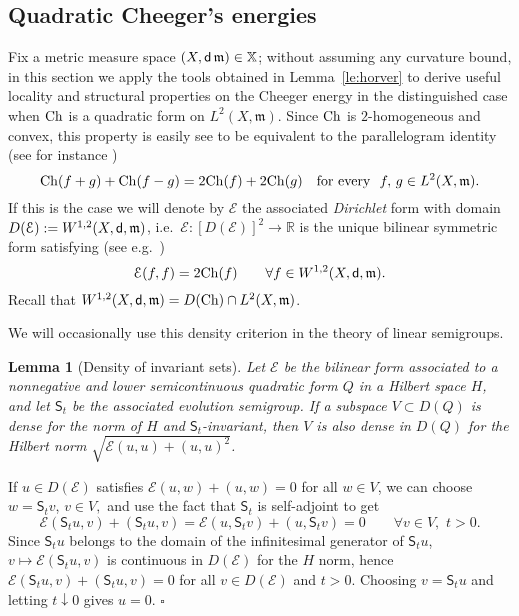 \documentclass[reqno,11pt]{article}
\numberwithin{equation}{section}
\newcommand{\C}{\mathbb{C}}
\newcommand{\Q}{\mathbb{Q}}
\newcommand{\R}{\mathbb{R}}
\newcommand{\mm}{{\mbox{\boldmath$m$}}}
\newcommand{\sfd}{{\sf d}}
\newcommand{\sfS}{{\sf S}}
\newcommand{\forevery}{\text{for every }}
\newenvironment{proof}{\removelastskip\par\medskip   %
\noindent{\em Proof.}
\rm}{\penalty-20\null\hfill$\square$\par\medbreak}
\newtheorem{lemma}[theorem]{Lemma}
\newcommand{\X}{\mathbb X}
\renewcommand{\C}{{\rm Ch}}
\renewcommand{\mm}{\mathfrak m}
\begin{document}
\subsection{Quadratic Cheeger's energies}
\label{sec:quadratic}

Fix a metric measure space $(X,\sfd\,\mm)\in \X$; without assuming
any curvature bound, in this section we apply the tools obtained in
Lemma~\ref{le:horver} to derive useful locality and structural
properties on the Cheeger energy in the distinguished case when $\C$
is a quadratic form on $L^2(X,\mm)$. Since $\C$ is $2$-homogeneous
and convex, this property is easily see to be equivalent to the
parallelogram identity (see for instance
\cite[Proposition~11.9]{DalMaso93})
\begin{equation}\label{eq:18}
      \C(f+g)+\C(f-g)=2\C(f)+2\C(g)\quad\forevery\ f,\,g\in
      L^2(X,\mm).
\end{equation}
If this is the case we will denote by $\mathcal E$ the associated
\emph{Dirichlet} form with domain $D(\mathcal
E):=W^{1,2}(X,\sfd,\mm)$, i.e.~$\mathcal E:[D(\mathcal E)]^2\to \R$
is the unique bilinear symmetric form satisfying (see e.g.\
\cite[Prop.~11.9]{DalMaso93})
\[
\mathcal E(f,f)=2\C(f)\qquad\forall f\in W^{1,2}(X,\sfd,\mm).
\]
Recall that $W^{1,2}(X,\sfd,\mm)=D(\C)\cap L^2(X,\mm)$.

We will occasionally use this density criterion in the theory of
linear semigroups.

\begin{lemma}[Density of invariant sets]\label{lem:invariant}
Let ${\mathcal E}$ be the bilinear form associated to a nonnegative
and lower semicontinuous quadratic form $Q$ in a Hilbert space $H$,
and let ${\mathsf S}_t$ be the associated evolution semigroup. If a
subspace $V\subset D(Q)$ is dense for the norm of $H$ and ${\mathsf
S}_t$-invariant, then $V$ is also dense in $D(Q)$ for the Hilbert
norm $\sqrt{{\mathcal E}(u,u)+(u,u)^2}$.
\end{lemma}
\begin{proof} If $u\in D({\mathcal E})$ satisfies ${\mathcal E}(u,w)+(u,w)=0$ for all $w\in V$,
we can choose $w={\mathsf S}_tv$, $v\in V,$ and use the fact that
${\mathsf S}_t$ is self-adjoint to get
$$
{\mathcal E}({\mathsf S}_tu,v)+({\mathsf S}_tu,v)={\mathcal
E}(u,{\mathsf S}_tv)+(u,{\mathsf S}_tv)=0\qquad\forall v\in
V,\,\,t>0.
$$
Since ${\mathsf S}_tu$ belongs to the domain of the infinitesimal
generator of ${\mathsf S}_tu$, $v\mapsto {\mathcal E}({\mathsf
S}_tu,v)$ is continuous in $D({\mathcal E})$ for the $H$ norm, hence
${\mathcal E}({\mathsf S}_tu,v)+({\mathsf S}_tu,v)=0$ for all $v\in
D({\mathcal E})$ and $t>0$. Choosing $v={\mathsf S}_tu$ and letting
$t\downarrow 0$ gives $u=0$.
%
\end{proof}
\end{document}
